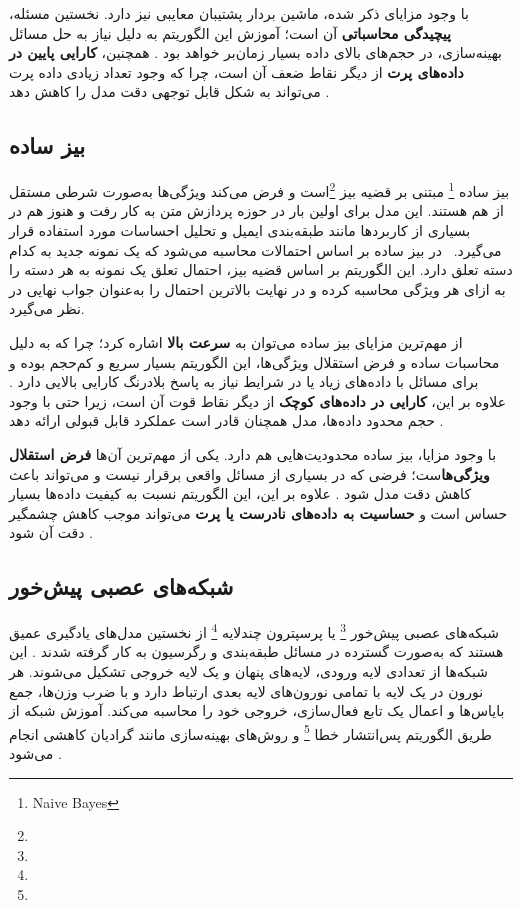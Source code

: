 با وجود مزایای ذکر شده، ماشین بردار پشتیبان معایبی نیز دارد. نخستین مسئله، \textbf{پیچیدگی محاسباتی} آن است؛ آموزش این الگوریتم به دلیل نیاز به حل مسائل بهینه‌سازی، در حجم‌های بالای داده بسیار زمان‌بر خواهد بود \cite{murphy2012machine}. همچنین، \textbf{کارایی پایین در داده‌های پرت} از دیگر نقاط ضعف آن است، چرا که وجود تعداد زیادی داده پرت می‌تواند به شکل قابل توجهی دقت مدل را کاهش دهد \cite{bishop2006pattern}.



\subsection{بیز ساده}
بیز ساده \footnote{Naive Bayes} مبتنی بر قضیه بیز \footnote{}است و فرض می‌کند ویژگی‌ها به‌صورت شرطی مستقل از هم هستند\cite{domingos1997optimal,mitchell1997machine}.
این مدل برای اولین بار در حوزه پردازش متن به کار رفت و هنوز هم در بسیاری از کاربردها مانند طبقه‌بندی ایمیل و تحلیل احساسات مورد استفاده قرار می‌گیرد\cite{mccallum1998comparison}. 
در بیز ساده بر اساس احتمالات محاسبه می‌شود که یک نمونه جدید به کدام دسته تعلق دارد. این الگوریتم بر اساس قضیه بیز، احتمال تعلق یک نمونه به هر دسته را به ازای هر ویژگی محاسبه کرده و در نهایت بالاترین احتمال را به‌عنوان جواب نهایی در نظر می‌گیرد\cite{bishop2006pattern}.


از مهم‌ترین مزایای بیز ساده می‌توان به \textbf{سرعت بالا} اشاره کرد؛ چرا که به دلیل محاسبات ساده و فرض استقلال ویژگی‌ها، این الگوریتم بسیار سریع و کم‌حجم بوده و برای مسائل با داده‌های زیاد یا در شرایط نیاز به پاسخ بلادرنگ کارایی بالایی دارد \cite{mccallum1998comparison}. علاوه بر این، \textbf{کارایی در داده‌های کوچک} از دیگر نقاط قوت آن است، زیرا حتی با وجود حجم محدود داده‌ها، مدل همچنان قادر است عملکرد قابل قبولی ارائه دهد \cite{murphy2012machine}.  


با وجود مزایا، بیز ساده محدودیت‌هایی هم دارد. یکی از مهم‌ترین آن‌ها \textbf{فرض استقلال ویژگی‌ها}ست؛ فرضی که در بسیاری از مسائل واقعی برقرار نیست و می‌تواند باعث کاهش دقت مدل شود \cite{domingos1997optimal}. علاوه بر این، این الگوریتم نسبت به کیفیت داده‌ها بسیار حساس است و \textbf{حساسیت به داده‌های نادرست یا پرت} می‌تواند موجب کاهش چشمگیر دقت آن شود \cite{bishop2006pattern}.


\subsection{شبکه‌های عصبی پیش‌خور}
شبکه‌های عصبی پیش‌خور \footnote{} یا پرسپترون چندلایه \footnote{} از نخستین مدل‌های یادگیری عمیق هستند که به‌صورت گسترده در مسائل طبقه‌بندی و رگرسیون به کار گرفته شدند \cite{bishop2006pattern}. این شبکه‌ها از تعدادی لایه ورودی، لایه‌های پنهان و یک لایه خروجی تشکیل می‌شوند. هر نورون در یک لایه با تمامی نورون‌های لایه بعدی ارتباط دارد و با ضرب وزن‌ها، جمع بایاس‌ها و اعمال یک تابع فعال‌سازی، خروجی خود را محاسبه می‌کند. آموزش شبکه از طریق الگوریتم پس‌انتشار خطا \footnote{} و روش‌های بهینه‌سازی مانند گرادیان کاهشی انجام می‌شود \cite{rumelhart1986learning}.  



